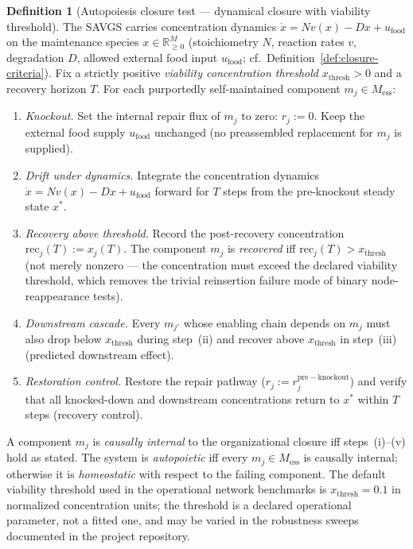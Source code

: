 \documentclass[11pt,a4paper]{article}
\theoremstyle{plain}
\theoremstyle{definition}
\newtheorem{definition}[theorem]{Definition}
\theoremstyle{remark}
\newcommand{\RR}{\mathbb{R}}
\begin{document}
\begin{definition}[Autopoiesis closure test --- dynamical closure with
viability threshold]
\label{def:autopoiesis}
The SAVGS carries concentration dynamics $\dot x = N v(x) - D x +
u_{\mathrm{food}}$ on the maintenance species $x \in \RR^{M}_{\geq 0}$
(stoichiometry $N$, reaction rates $v$, degradation $D$, allowed
external food input $u_{\mathrm{food}}$; cf.\
Definition~\ref{def:closure-criteria}). Fix a strictly positive
\emph{viability concentration threshold} $x_{\mathrm{thresh}} > 0$ and
a recovery horizon $T$. For each purportedly self-maintained
component $m_j \in M_{\mathrm{ess}}$:
\begin{enumerate}[label=\textit{(\roman*)},leftmargin=*,itemsep=2pt]
\item \emph{Knockout.} Set the internal repair flux of
$m_j$ to zero: $r_j := 0$. Keep the external food supply
$u_{\mathrm{food}}$ unchanged (no preassembled replacement for $m_j$
is supplied).
\item \emph{Drift under dynamics.} Integrate the
concentration dynamics $\dot x = N v(x) - D x + u_{\mathrm{food}}$
forward for $T$ steps from the pre-knockout steady state $x^*$.
\item \emph{Recovery above threshold.} Record the
post-recovery concentration $\mathrm{rec}_{j}(T) := x_{j}(T)$. The
component $m_j$ is \emph{recovered} iff
$\mathrm{rec}_{j}(T) > x_{\mathrm{thresh}}$ (not merely nonzero ---
the concentration must exceed the declared viability threshold, which
removes the trivial reinsertion failure mode of binary node-reappearance
tests).
\item \emph{Downstream cascade.} Every $m_{j'}$ whose
enabling chain depends on $m_j$ must also drop below
$x_{\mathrm{thresh}}$ during step~(ii) and recover above
$x_{\mathrm{thresh}}$ in step~(iii) (predicted downstream effect).
\item \emph{Restoration control.} Restore the repair
pathway ($r_j := r_j^{\mathrm{pre-knockout}}$) and verify that all
knocked-down and downstream concentrations return to $x^*$ within $T$
steps (recovery control).
\end{enumerate}
A component $m_j$ is \emph{causally internal} to the organizational
closure iff steps~(i)--(v) hold as stated. The system is
\emph{autopoietic} iff every $m_j \in M_{\mathrm{ess}}$ is causally
internal; otherwise it is \emph{homeostatic} with respect to the
failing component. The default viability threshold used in the
operational network benchmarks
is $x_{\mathrm{thresh}} = 0.1$ in normalized concentration units; the
threshold is a declared operational parameter, not a fitted one, and
may be varied in the robustness sweeps
documented in the project repository.
\end{definition}
\end{document}
